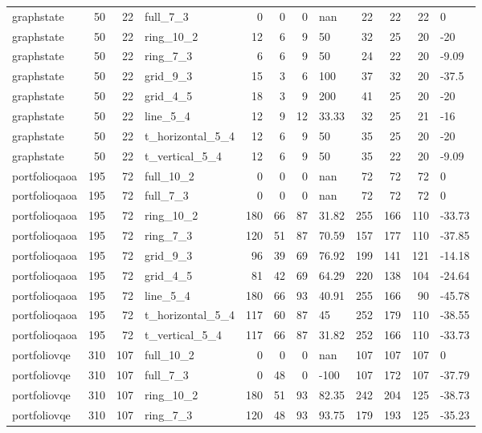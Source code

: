 \begin{longtable}{lrrlrrrlrrrl}
graphstate & 50 & 22 & full\_7\_3 & 0 & 0 & 0 & nan & 22 & 22 & 22 & 0 \\
graphstate & 50 & 22 & ring\_10\_2 & 12 & 6 & 9 & 50 & 32 & 25 & 20 & -20 \\
graphstate & 50 & 22 & ring\_7\_3 & 6 & 6 & 9 & 50 & 24 & 22 & 20 & -9.09 \\
graphstate & 50 & 22 & grid\_9\_3 & 15 & 3 & 6 & 100 & 37 & 32 & 20 & -37.5 \\
graphstate & 50 & 22 & grid\_4\_5 & 18 & 3 & 9 & 200 & 41 & 25 & 20 & -20 \\
graphstate & 50 & 22 & line\_5\_4 & 12 & 9 & 12 & 33.33 & 32 & 25 & 21 & -16 \\
graphstate & 50 & 22 & t\_horizontal\_5\_4 & 12 & 6 & 9 & 50 & 35 & 25 & 20 & -20 \\
graphstate & 50 & 22 & t\_vertical\_5\_4 & 12 & 6 & 9 & 50 & 35 & 22 & 20 & -9.09 \\
portfolioqaoa & 195 & 72 & full\_10\_2 & 0 & 0 & 0 & nan & 72 & 72 & 72 & 0 \\
portfolioqaoa & 195 & 72 & full\_7\_3 & 0 & 0 & 0 & nan & 72 & 72 & 72 & 0 \\
portfolioqaoa & 195 & 72 & ring\_10\_2 & 180 & 66 & 87 & 31.82 & 255 & 166 & 110 & -33.73 \\
portfolioqaoa & 195 & 72 & ring\_7\_3 & 120 & 51 & 87 & 70.59 & 157 & 177 & 110 & -37.85 \\
portfolioqaoa & 195 & 72 & grid\_9\_3 & 96 & 39 & 69 & 76.92 & 199 & 141 & 121 & -14.18 \\
portfolioqaoa & 195 & 72 & grid\_4\_5 & 81 & 42 & 69 & 64.29 & 220 & 138 & 104 & -24.64 \\
portfolioqaoa & 195 & 72 & line\_5\_4 & 180 & 66 & 93 & 40.91 & 255 & 166 & 90 & -45.78 \\
portfolioqaoa & 195 & 72 & t\_horizontal\_5\_4 & 117 & 60 & 87 & 45 & 252 & 179 & 110 & -38.55 \\
portfolioqaoa & 195 & 72 & t\_vertical\_5\_4 & 117 & 66 & 87 & 31.82 & 252 & 166 & 110 & -33.73 \\
portfoliovqe & 310 & 107 & full\_10\_2 & 0 & 0 & 0 & nan & 107 & 107 & 107 & 0 \\
portfoliovqe & 310 & 107 & full\_7\_3 & 0 & 48 & 0 & -100 & 107 & 172 & 107 & -37.79 \\
portfoliovqe & 310 & 107 & ring\_10\_2 & 180 & 51 & 93 & 82.35 & 242 & 204 & 125 & -38.73 \\
portfoliovqe & 310 & 107 & ring\_7\_3 & 120 & 48 & 93 & 93.75 & 179 & 193 & 125 & -35.23 \\

\end{longtable}
